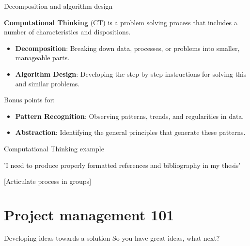 \documentclass[aspectratio=1610, 11pt]{beamer} %
\begin{document}
\begin{frame}{Decomposition and algorithm design}

\textbf{Computational Thinking }(CT) is a problem solving process that includes a number of characteristics and dispositions. \cite{Google2019-es}
\begin{itemize}[label=\textbullet]
    \item \textbf{Decomposition}: Breaking down data, processes, or problems into smaller, manageable parts.
    \item \textbf{Algorithm Design}: Developing the step by step instructions for solving this and similar problems.
\end{itemize}

Bonus points for:
\begin{itemize}
    \item \textbf{Pattern Recognition}: Observing patterns, trends, and regularities in data.
    \item \textbf{Abstraction}: Identifying the general principles that generate these patterns.
\end{itemize}
\end{frame}

\begin{frame}{Computational Thinking example}

'I need to produce properly formatted references and bibliography in my thesis'

[Articulate process in groups]

\end{frame}

 \section{Project management 101}

 \begin{frame}{Developing ideas towards a solution}
     So you have great ideas, what next? 
 \end{frame}
\end{document}
